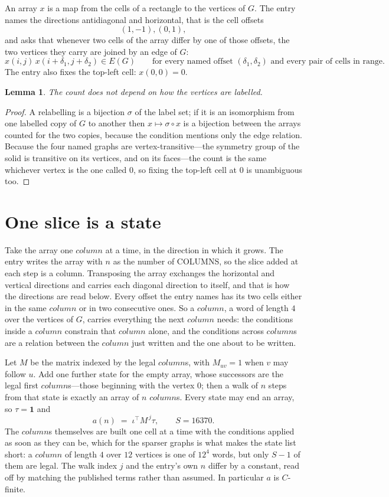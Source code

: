 \documentclass[11pt,a4paper]{article}
\theoremstyle{plain}
\newtheorem{lemma}[theorem]{Lemma}
\theoremstyle{definition}
\begin{document}
An array $x$ is a map from the cells of a rectangle to the vertices of $G$. The entry names the
directions antidiagonal and horizontal, that is the cell offsets
\[
(1,-1), (0,1),
\]
and asks that whenever two cells of the array differ by one of those offsets, the two vertices
they carry are joined by an edge of $G$:
\[
x(i,j)\,x(i+\delta_1,j+\delta_2)\in E(G)\qquad
\text{for every named offset } (\delta_1,\delta_2)\text{ and every pair of cells in range.}
\]
The entry also fixes the top-left cell: $x(0,0)=0$.

\begin{lemma}\label{lem:label}
The count does not depend on how the vertices are labelled.
\end{lemma}

\begin{proof}
A relabelling is a bijection $\sigma$ of the label set; if it is an isomorphism from one
labelled copy of $G$ to another then $x\mapsto\sigma\circ x$ is a bijection between the arrays
counted for the two copies, because the condition mentions only the edge relation.
Because the four named graphs are vertex-transitive---the symmetry group of the solid is transitive on its vertices, and on its faces---the count is the same whichever vertex is the one called $0$, so fixing the top-left cell at $0$ is unambiguous too.
\end{proof}

\section{One slice is a state}

Take the array one $column$ at a time, in the direction in which it grows. The entry writes the array with $n$ as the number of COLUMNS, so the slice added at each step is a column. Transposing the array exchanges the horizontal and vertical directions and carries each diagonal direction to itself, and that is how the directions are read below.
Every offset the entry names has its two cells either in the same $column$ or in two
consecutive ones. So a $column$, a word of length $4$ over the vertices of $G$, carries
everything the next $column$ needs: the conditions inside a $column$ constrain that
$column$ alone, and the conditions across $column$s are a relation between the
$column$ just written and the one about to be written.

Let $M$ be the matrix indexed by the legal $column$s, with $M_{uv}=1$ when $v$ may
follow $u$. Add one further state for the empty array, whose successors are the legal first
$column$s---those beginning with the vertex $0$; then a walk of
$n$ steps from that state is exactly an array of $n$ $column$s. Every state may end an
array, so $\tau=\mathbf{1}$ and
\[
a(n)\;=\;\iota^{\!\top}M^{\,j}\tau ,\qquad S=16370.
\]
The $column$s themselves are built one cell at a time with the conditions applied as soon
as they can be, which for the sparser graphs is what makes the state list short: a $column$
of length $4$ over $12$ vertices is one of $12^{4}$ words, but only $S-1$ of them are
legal. The walk index $j$ and the entry's own $n$ differ by a constant, read off by matching the
published terms rather than assumed. In particular $a$ is $C$-finite.
\end{document}
